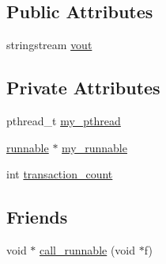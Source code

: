 \subsection*{Public Attributes}
\begin{DoxyCompactItemize}
\item 
stringstream \hyperlink{classthread_a96a5f4b8956359ad5840c7178c4ca32e}{vout}
\end{DoxyCompactItemize}
\subsection*{Private Attributes}
\begin{DoxyCompactItemize}
\item 
pthread\-\_\-t \hyperlink{classthread_aa59a950277a15e2662021b3fe6cd3df6}{my\-\_\-pthread}
\item 
\hyperlink{classrunnable}{runnable} $\ast$ \hyperlink{classthread_a1cfb7ceefe6a1e6ca21bab30145668a0}{my\-\_\-runnable}
\item 
int \hyperlink{classthread_a322a7b4d5150e631784b84bc200b0e11}{transaction\-\_\-count}
\end{DoxyCompactItemize}
\subsection*{Friends}
\begin{DoxyCompactItemize}
\item 
void $\ast$ \hyperlink{classthread_a91d61cfabf61446ae3d24e21a825f854}{call\-\_\-runnable} (void $\ast$f)
\end{DoxyCompactItemize}


